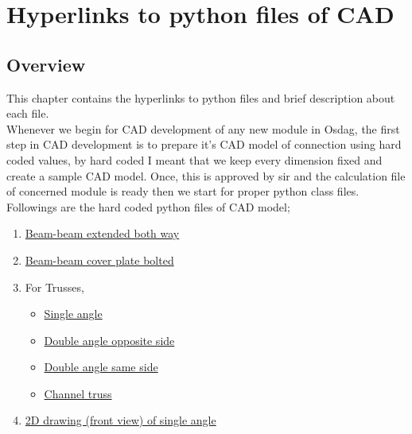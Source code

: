 \chapter{Hyperlinks to python files of CAD}
\section{Overview}
This chapter contains the hyperlinks to python files and brief description about each file.\\
Whenever we begin for CAD development of any new module in Osdag, the first step in CAD development is to prepare it's CAD model of connection using hard coded values, by hard coded I meant that we keep every dimension fixed and create a sample CAD model. Once, this is approved by sir and the calculation file of concerned module is ready then we start for proper python class files.
Followings are the hard coded python files of CAD model;

\begin{enumerate}
	\item \href{https://github.com/chavan-vjti/Osdag_Self/blob/master/Connections/Moment/Beam_Beam/Inputs_For_CAD.py}{Beam-beam extended both way}
	\item \href{https://github.com/chavan-vjti/Osdag\_Self/blob/master/Connections/Moment/Beam\_Beam_cover_plates/cover_plate_calc.py}{Beam-beam cover plate bolted}
	\item For Trusses, 
		\begin{itemize}
			\item \href{https://github.com/chavan-vjti/Osdag_Self/blob/TrussSample/Connections/Truss/SingleAngle.py}{Single angle}
			\item \href{https://github.com/chavan-vjti/Osdag_Self/blob/TrussSample/Connections/Truss/DoubleAngleOpposite.py}{Double angle opposite side}
			\item \href{https://github.com/chavan-vjti/Osdag_Self/blob/TrussSample/Connections/Truss/DoubleAngleSameSide.py}{Double angle same side}
			\item \href{https://github.com/chavan-vjti/Osdag_Self/blob/TrussSample/Connections/Truss/channel_truss.py}{Channel truss}
		\end{itemize}
	\item \href{https://github.com/chavan-vjti/Osdag_Self/blob/truss_drawing/Connections/Truss/drawing_2D/drawing_2D.py}{2D drawing (front view) of single angle}
\end{enumerate}